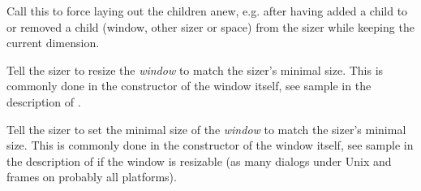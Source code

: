 \label{wxsizerlayout}


Call this to force laying out the children anew, e.g. after having added a child
to or removed a child (window, other sizer or space) from the sizer while keeping
the current dimension.

\label{wxsizerfit}


Tell the sizer to resize the {\it window} to match the sizer's minimal size. This
is commonly done in the constructor of the window itself, see sample in the description
of .

\label{wxsizersetsizehints}


Tell the sizer to set the minimal size of the {\it window} to match the sizer's minimal size.
This is commonly done in the constructor of the window itself, see sample in the description
of  if the window is resizable (as many dialogs under Unix and
frames on probably all platforms).

